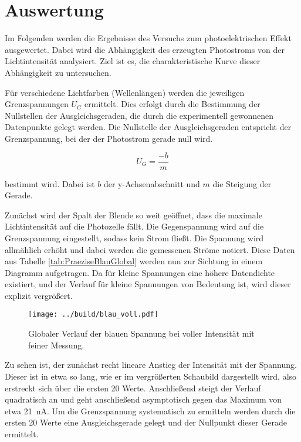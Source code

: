 


\section{Auswertung}
\label{sec:Auswertung}

Im Folgenden werden die Ergebnisse des Versuchs zum photoelektrischen Effekt ausgewertet. Dabei wird die Abhängigkeit des erzeugten 
Photostroms von der Lichtintensität analysiert. Ziel ist es, die charakteristische Kurve dieser Abhängigkeit zu untersuchen.

Für verschiedene Lichtfarben (Wellenlängen) werden die jeweiligen Grenzspannungen $U_G$ ermittelt. Dies erfolgt durch die 
Bestimmung der Nullstellen der Ausgleichsgeraden, die durch die experimentell gewonnenen Datenpunkte gelegt werden. Die Nullstelle 
der Ausgleichsgeraden entspricht der Grenzspannung, bei der der Photostrom gerade null wird.

\begin{equation}
    U_G=\frac{-b}{m}
    \label{eqn:Nullstelle}
\end{equation}

\noindent bestimmt wird. Dabei ist $b$ der y-Achsenabschnitt und $m$ die Steigung der Gerade.

Zunächst wird der Spalt der Blende so weit geöffnet, dass die maximale Lichtintensität auf die Photozelle fällt. Die Gegenspannung 
wird auf die Grenzspannung eingestellt, sodass kein Strom fließt. Die Spannung wird allmählich erhöht und dabei werden die gemessenen 
Ströme notiert. Diese Daten aus Tabelle \ref{tab:PraeziseBlauGlobal} werden nun zur Sichtung in einem Diagramm aufgetragen. Da für 
kleine Spannungen eine höhere Datendichte existiert, und der Verlauf für kleine Spannungen von Bedeutung ist, wird dieser explizit 
vergrößert. 

\begin{figure}[H]
    \centering
    \texttt{[image: ../build/blau\_voll.pdf]}
    \caption{Globaler Verlauf der blauen Spannung bei voller Intensität mit feiner Messung.}
\end{figure}

\noindent Zu sehen ist, der zunächst recht lineare Anstieg der Intensität mit der Spannung. Dieser ist in etwa so lang, wie er im 
vergrößerten Schaubild dargestellt wird, also erstreckt sich über die ersten 20 Werte. Anschließend steigt der Verlauf quadratisch 
an und geht anschließend asymptotisch gegen das Maximum von etwa \qty{21}{\nano\ampere}. Um die Grenzspannung systematisch zu 
ermitteln werden durch die ersten 20 Werte eine Ausgleichsgerade gelegt und der Nullpunkt dieser Gerade ermittelt. 

